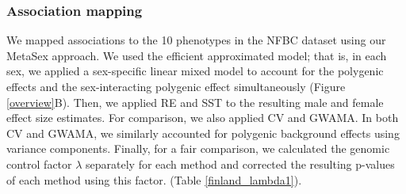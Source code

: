 \documentclass[11pt]{article}
\begin{document}
%


\subsubsection*{Association mapping}

We mapped associations to the 10 phenotypes in the NFBC dataset using our MetaSex approach.
We used the efficient approximated model; 
that is, in each sex, we applied a sex-specific linear mixed model to account for the polygenic effects and the sex-interacting polygenic effect simultaneously (Figure \ref{overview}B).
Then, we applied RE and SST to the resulting male and female effect size estimates.
For comparison, we also applied CV and GWAMA. 
In both CV and GWAMA, we similarly accounted for polygenic background effects using variance components.
Finally, for a fair comparison, we calculated the genomic control factor $\lambda$ separately for each method and
corrected the resulting p-values of each method using this factor.
(Table \ref{finland_lambda1}).

%
%
%
%
\end{document}
